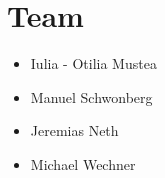 \documentclass[a4paper,pagesize 10pt]{scrartcl}
\begin{document}
\section{Team}
\begin{itemize}
	\item Iulia - Otilia Mustea
	\item Manuel Schwonberg
	\item Jeremias Neth
	\item Michael Wechner
\end{itemize}


{\small
	
	
}
\end{document}
